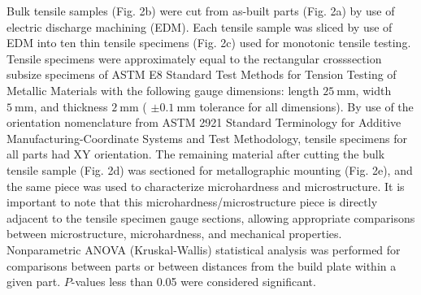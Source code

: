 \documentclass[10pt]{article}
\begin{document}
Bulk tensile samples (Fig. 2b) were cut from as-built parts (Fig. 2a) by use of electric discharge machining (EDM). Each tensile sample was sliced by use of EDM into ten thin tensile specimens (Fig. 2c) used for monotonic tensile testing. Tensile specimens were approximately equal to the rectangular crosssection subsize specimens of ASTM E8 Standard Test Methods for Tension Testing of Metallic Materials with the following gauge dimensions: length $25 \mathrm{~mm}$, width $5 \mathrm{~mm}$, and thickness $2 \mathrm{~mm}$ ( $\pm 0.1 \mathrm{~mm}$ tolerance for all dimensions). By use of the orientation nomenclature from ASTM 2921 Standard Terminology for Additive Manufacturing-Coordinate Systems and Test Methodology, tensile specimens for all parts had XY orientation. The remaining material after cutting the bulk tensile sample (Fig. 2d) was sectioned for metallographic mounting (Fig. 2e), and the same piece was used to characterize microhardness and microstructure. It is important to note that this microhardness/microstructure piece is directly adjacent to the tensile specimen gauge sections, allowing appropriate comparisons between microstructure, microhardness, and mechanical properties. Nonparametric ANOVA (Kruskal-Wallis) statistical analysis was performed for comparisons between parts or between distances from the build plate within a given part. $P$-values less than 0.05 were considered significant.
\end{document}
